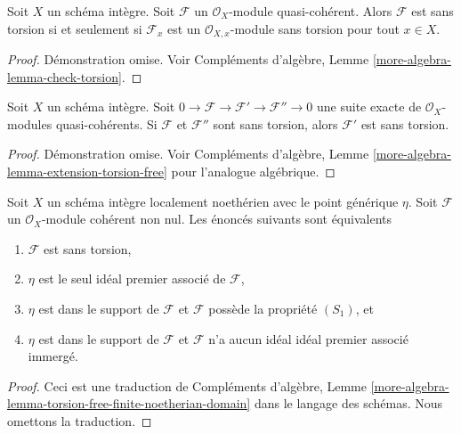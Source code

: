 \begin{lemma}
\label{lemma-check-torsion}
Soit  $X$  un schéma intègre. Soit  $\mathcal{F}$  un  $\mathcal{O}_X$-module
quasi-cohérent. Alors  $\mathcal{F}$  est sans torsion si et seulement si
 $\mathcal{F}_x$  est un  $\mathcal{O}_{X, x}$-module sans torsion pour tout  $x \in X$.
\end{lemma}

\begin{proof}
Démonstration omise. Voir Compléments d'algèbre, Lemme  \ref{more-algebra-lemma-check-torsion}.
\end{proof}

\begin{lemma}
\label{lemma-extension-torsion-free}
Soit  $X$  un schéma intègre. Soit  $0 \to \mathcal{F} \to \mathcal{F}' \to \mathcal{F}'' \to 0$  une suite exacte de
 $\mathcal{O}_X$-modules quasi-cohérents. Si  $\mathcal{F}$  et  $\mathcal{F}''$  sont sans
torsion, alors  $\mathcal{F}'$  est sans torsion.
\end{lemma}

\begin{proof}
Démonstration omise. Voir Compléments d'algèbre, Lemme  \ref{more-algebra-lemma-extension-torsion-free}  pour l'analogue algébrique.
\end{proof}

\begin{lemma}
\label{lemma-torsion-free-finite-noetherian-domain}
Soit  $X$  un schéma intègre localement noethérien avec le point générique
 $\eta$. Soit  $\mathcal{F}$  un  $\mathcal{O}_X$-module cohérent non nul. Les
énoncés suivants sont équivalents
\begin{enumerate}
\item $\mathcal{F}$  est sans torsion,
\item $\eta$  est le seul idéal premier associé de  $\mathcal{F}$,
\item $\eta$  est dans le support de  $\mathcal{F}$  et  $\mathcal{F}$  possède la
propriété  $(S_1)$, et
\item $\eta$  est dans le support de  $\mathcal{F}$  et  $\mathcal{F}$  n'a aucun idéal
idéal premier associé immergé.
\end{enumerate}
\end{lemma}

\begin{proof}
Ceci est une traduction de Compléments d'algèbre, Lemme  \ref{more-algebra-lemma-torsion-free-finite-noetherian-domain}  dans le langage
des schémas. Nous omettons la traduction.
\end{proof}

